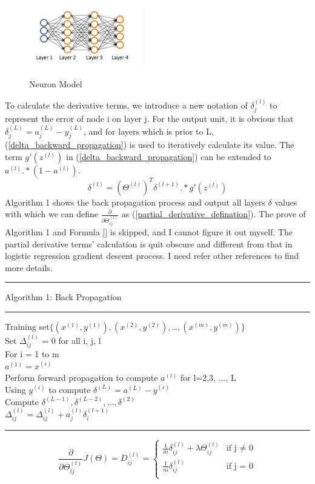\documentclass{article}
\begin{document}
\begin{figure}[ht]
  \centering
  \includegraphics[width=5cm]{Figure7.jpg}\\
  \caption{Neuron Model}\label{four_layer_neural_networks}
\end{figure}
To calculate the derivative terms, we introduce a new notation of $\delta_{j}^{(l)}$ to represent the error of node i on layer j. For the output unit, it is obvious that $\delta_{j}^{(L)} = a_{j}^{(L)} - y_{j}^{(L)}$, and for layers which is prior to L, (\ref{delta_backward_propagation}) is used to iteratively calculate its value. The term $g'(z^{(l)})$ in (\ref{delta_backward_propagation}) can be extended to $a^{(l)}.*(1-a^{(l)})$.
\begin{equation}\label{delta_backward_propagation}
\delta^{(l)} = (\Theta^{(l)})^{T}\delta^{(l+1)}.*g'(z^{(l)})
\end{equation}
Algorithm 1 shows the back propagation process and output all layers $\delta$ values with which we can define $\frac{\partial}{\partial \Theta_{ij}^{(l)}}$ as (\ref{partial_derivative_defination}). The prove of Algorithm 1 and Formula \ref{} is skipped, and I cannot figure it out myself. The partial derivative terms' calculation is quit obscure and different from that in logistic regression gradient descent process. I need refer other references to find more details.
\smallskip
\hrule
\smallskip
Algorithm 1: Back Propagation
\smallskip
\hrule
\smallskip
Training set$\{(x^{(1)}, y^{(1)}), (x^{(2)}, y^{(2)}), $\ldots$ , (x^{(m)}, y^{(m)})\}$\\
Set $\Delta_{ij}^{(l)}$ = 0 for all i, j, l\\
For i = 1 to m\\
\indent $a^{(1)} = x^{(i)}$\\
\indent Perform forward propagation to compute $a^{(l)}$ for l=2,3, $\ldots$, L\\
\indent Using $y^{(i)}$ to compute $\delta^{(L)} = a^{(L)} - y^{(i)}$\\
\indent Compute $\delta^{(L-1)}, \delta^{(L-2)}, \ldots, \delta^{(2)}$\\
\indent $\Delta_{ij}^{(l)} = \Delta_{ij}^{(l)} + a_{j}^{(l)}\delta_{i}^{(l+1)}$\\
\hrule
\medskip
\begin{equation}\label{partial_derivative_defination}
\frac{\partial}{\partial \Theta_{ij}^{(l)}}J(\Theta) = D_{ij}^{(l)} = \left\{ \begin{array}{ll}
\frac{1}{m}\delta_{ij}^{(l)} + \lambda \Theta_{ij}^{(l)} & \textrm{if j $\neq$ 0}\\
\frac{1}{m}\delta_{ij}^{(l)} & \textrm{if j = 0}\\
\end{array} \right.
\end{equation}
\end{document}
